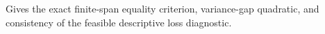 Gives the exact finite-span equality criterion, variance-gap quadratic, and consistency of the feasible descriptive loss diagnostic.